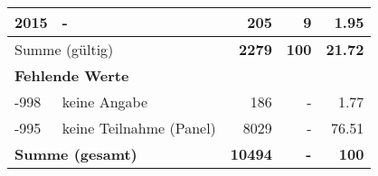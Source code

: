 \begin{longtable}{lXrrr}
     2015 &
     \multicolumn{1}{X}{ -  } &


       \num{205} &
       \num[round-mode=places,round-precision=2]{9} &
         \num[round-mode=places,round-precision=2]{1.95} \\
     \midrule
     \multicolumn{2}{l}{Summe (gültig)} &
       \textbf{\num{2279}} &
     \textbf{\num{100}} &
       \textbf{\num[round-mode=places,round-precision=2]{21.72}} \\
     \multicolumn{5}{l}{\textbf{Fehlende Werte}}\\
       -998 &
       keine Angabe &
         \num{186} &
        - &
         \num[round-mode=places,round-precision=2]{1.77} \\
       -995 &
       keine Teilnahme (Panel) &
         \num{8029} &
        - &
         \num[round-mode=places,round-precision=2]{76.51} \\
     \midrule
     \multicolumn{2}{l}{\textbf{Summe (gesamt)}} &
          \textbf{\num{10494}} &
        \textbf{-} &
        \textbf{\num{100}} \\
     \bottomrule
     \end{longtable}
     
